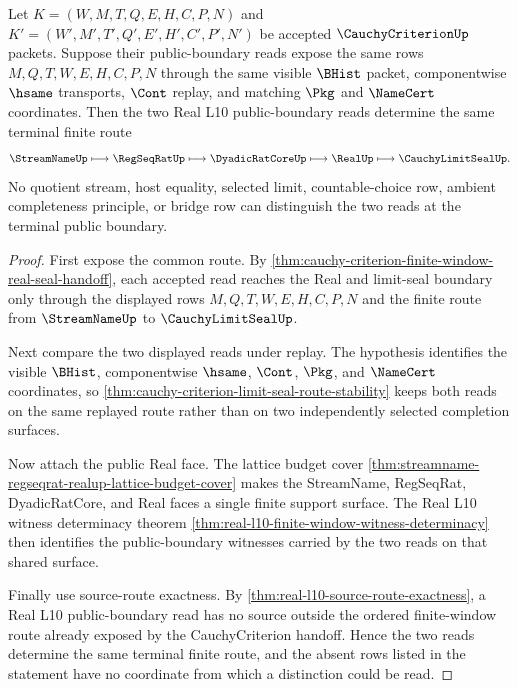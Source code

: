 \begin{theorem}
\label{thm:cauchy-criterion-real-seal-unique-finite-route}
Let $K=(W,M,T,Q,E,H,C,P,N)$ and
$K'=(W',M',T',Q',E',H',C',P',N')$ be accepted $\CauchyCriterionUp$ packets.
Suppose their public-boundary reads expose the same rows
$M,Q,T,W,E,H,C,P,N$ through the same visible $\BHist$ packet, componentwise
$\hsame$ transports, $\Cont$ replay, and matching $\Pkg$ and $\NameCert$
coordinates. Then the two Real L10 public-boundary reads determine the same
terminal finite route
$$
\StreamNameUp
\longmapsto \RegSeqRatUp
\longmapsto \DyadicRatCoreUp
\longmapsto \RealUp
\longmapsto \CauchyLimitSealUp .
$$
No quotient stream, host equality, selected limit, countable-choice row,
ambient completeness principle, or bridge row can distinguish the two reads at
the terminal public boundary.
\end{theorem}
\begin{proof}
First expose the common route. By
\autoref{thm:cauchy-criterion-finite-window-real-seal-handoff}, each accepted
read reaches the Real and limit-seal boundary only through the displayed rows
$M,Q,T,W,E,H,C,P,N$ and the finite route from $\StreamNameUp$ to
$\CauchyLimitSealUp$.

Next compare the two displayed reads under replay. The hypothesis identifies
the visible $\BHist$, componentwise $\hsame$, $\Cont$, $\Pkg$, and $\NameCert$
coordinates, so \autoref{thm:cauchy-criterion-limit-seal-route-stability} keeps
both reads on the same replayed route rather than on two independently selected
completion surfaces.

Now attach the public Real face. The lattice budget cover
\autoref{thm:streamname-regseqrat-realup-lattice-budget-cover} makes the
StreamName, RegSeqRat, DyadicRatCore, and Real faces a single finite support
surface. The Real L10 witness determinacy theorem
\autoref{thm:real-l10-finite-window-witness-determinacy} then identifies the
public-boundary witnesses carried by the two reads on that shared surface.

Finally use source-route exactness. By
\autoref{thm:real-l10-source-route-exactness}, a Real L10 public-boundary read
has no source outside the ordered finite-window route already exposed by the
CauchyCriterion handoff. Hence the two reads determine the same terminal finite
route, and the absent rows listed in the statement have no coordinate from
which a distinction could be read.
\end{proof}


